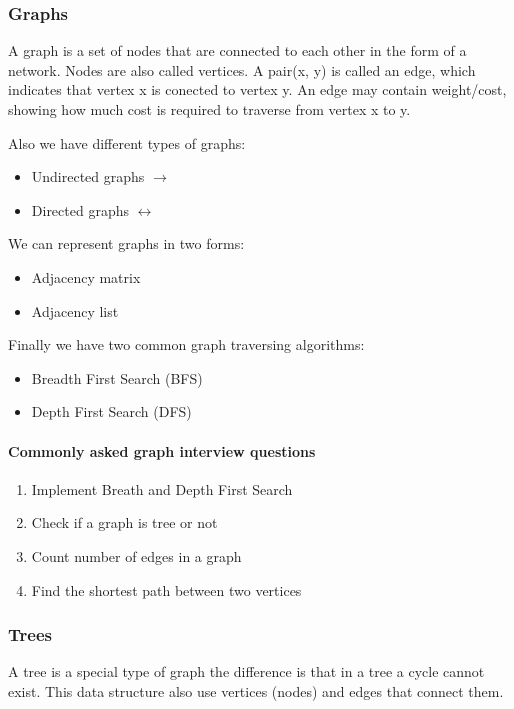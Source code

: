 \subsubsection{Graphs}
A graph is a set of nodes that are connected to each other in the form of a network. Nodes are also called vertices. A pair(x, y) is called an edge, which indicates that vertex x is conected to vertex y. An edge may contain weight/cost, showing how much cost is required to traverse from vertex x to y.

Also we have different types of graphs:
\begin{itemize}
    \item { Undirected graphs $ \longrightarrow $ }
    \item { Directed graphs $ \longleftrightarrow $ }
\end{itemize}

We can represent graphs in two forms:
\begin{itemize}
    \item { Adjacency matrix }
    \item { Adjacency list }
\end{itemize}

Finally we have two common graph traversing algorithms:
\begin{itemize}
    \item { Breadth First Search (BFS)}
    \item { Depth First Search (DFS) }
\end{itemize}

\paragraph{Commonly asked graph interview questions}
\begin{enumerate}
    \item { Implement Breath and Depth First Search }
    \item { Check if a graph is tree or not }
    \item { Count number of edges in a graph }
    \item { Find the shortest path between two vertices }
\end{enumerate}

\subsubsection{Trees}
A tree is a special type of graph the difference is that in a tree a cycle cannot exist. This data structure also use vertices (nodes) and edges that connect them.

